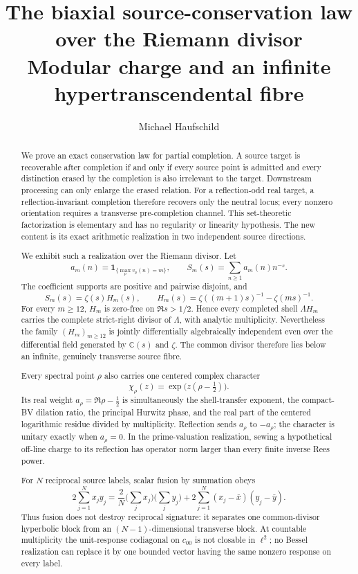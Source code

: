 \documentclass[11pt]{article}
\title{\textbf{The biaxial source-conservation law over the Riemann divisor}\\
\large Modular charge and an infinite hypertranscendental fibre}
\author{Michael Haufschild}
\date{}
\theoremstyle{definition}
\theoremstyle{remark}
\newcommand{\C}{\mathbb C}
\begin{document}
\maketitle

\begin{abstract}
We prove an exact conservation law for partial completion.  A source target is recoverable after completion
if and only if every source point is admitted and every distinction erased by the completion is
also irrelevant to the target.  Downstream processing can only enlarge the erased relation.  For
a reflection-odd real target, a reflection-invariant completion therefore recovers only the
neutral locus; every nonzero orientation requires a transverse pre-completion channel.  This
set-theoretic factorization is elementary and has no regularity or linearity hypothesis.  The
new content is its exact arithmetic realization in two independent source directions.

We exhibit such a realization over the Riemann divisor.  Let
\[
 a_m(n)=\mathbf1_{\{\max_p v_p(n)=m\}},\qquad
 S_m(s)=\sum_{n\geq1}a_m(n)n^{-s}.
\]
The coefficient supports are positive and pairwise disjoint, and
\[
 S_m(s)=\zeta(s)H_m(s),\qquad
 H_m(s)=\zeta((m+1)s)^{-1}-\zeta(ms)^{-1}.
\]
For every $m\geq12$, $H_m$ is zero-free on $\Re s>1/2$.  Hence every completed
shell $\Lambda H_m$ carries the complete strict-right divisor of $\Lambda$, with analytic
multiplicity.  Nevertheless the family $(H_m)_{m\geq12}$ is jointly differentially
algebraically independent even over the differential field generated by $\C(s)$ and $\zeta$.
The common divisor therefore lies below an infinite, genuinely transverse source fibre.

Every spectral point $\rho$ also carries one centered complex character
\[
 \chi_\rho(z)=\exp\!\bigl(z(\rho-\tfrac12)\bigr).
\]
Its real weight $a_\rho=\Re\rho-\tfrac12$ is simultaneously the shell-transfer exponent, the
compact-BV dilation ratio, the principal Hurwitz phase, and the real part of the centered
logarithmic residue divided by multiplicity.  Reflection sends $a_\rho$ to $-a_\rho$; the
character is unitary exactly when $a_\rho=0$.  In the prime-valuation realization, sewing a
hypothetical off-line charge to its reflection has operator norm larger than every finite inverse
Rees power.

For $N$ reciprocal source labels, scalar fusion by summation obeys
\[
 2\sum_{j=1}^N x_jy_j
 =\frac{2}{N}\Big(\sum_jx_j\Big)\Big(\sum_jy_j\Big)
  +2\sum_{j=1}^N(x_j-\bar x)(y_j-\bar y).
\]
Thus fusion does not destroy reciprocal signature: it separates one common-divisor hyperbolic
block from an $(N-1)$-dimensional transverse block.  At countable multiplicity the unit-response
codiagonal on $c_{00}$ is not closable in $\ell^2$; no Bessel realization can replace it by one
bounded vector having the same nonzero response on every label.


\end{abstract}
\end{document}
